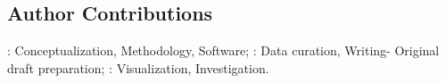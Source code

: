 \begin{titlepage}
        \section*{Author Contributions}
        \textbf{\authorone}: Conceptualization, Methodology, Software; \textbf{\authortwo}: Data curation, Writing- Original draft preparation; \textbf{\authorthree}: Visualization, Investigation.
        
    \end{titlepage}